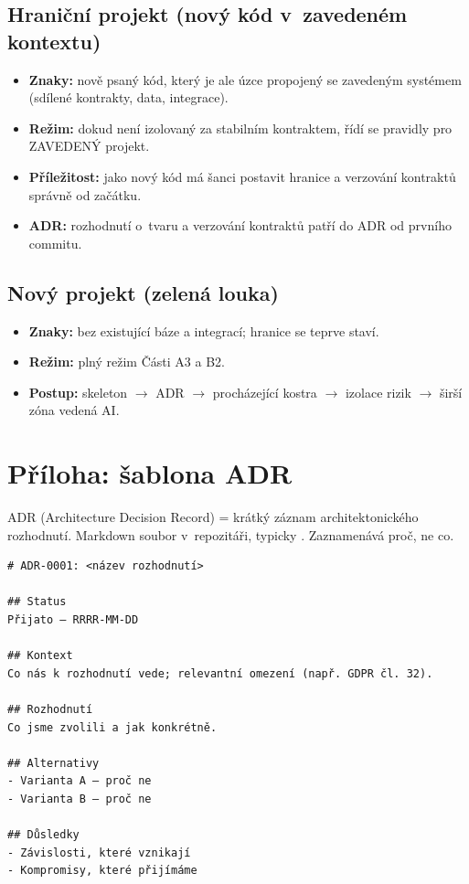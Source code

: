 \subsection{Hraniční projekt (nový kód v~zavedeném kontextu)}

\begin{itemize}
\item \textbf{Znaky:} nově psaný kód, který je ale úzce propojený se zavedeným systémem (sdílené kontrakty, data, integrace).
\item \textbf{Režim:} dokud není izolovaný za stabilním kontraktem, řídí se pravidly pro ZAVEDENÝ projekt.
\item \textbf{Příležitost:} jako nový kód má šanci postavit hranice a verzování kontraktů správně od začátku.
\item \textbf{ADR:} rozhodnutí o~tvaru a verzování kontraktů patří do ADR od prvního commitu.
\end{itemize}

\subsection{Nový projekt (zelená louka)}

\begin{itemize}
\item \textbf{Znaky:} bez existující báze a integrací; hranice se teprve staví.
\item \textbf{Režim:} plný režim Části A3 a B2.
\item \textbf{Postup:} skeleton $\rightarrow$ ADR $\rightarrow$ procházející kostra $\rightarrow$ izolace rizik $\rightarrow$ širší zóna vedená AI.
\end{itemize}

\section{Příloha: šablona ADR}

ADR (Architecture Decision Record) = krátký záznam architektonického rozhodnutí.
Markdown soubor v~repozitáři, typicky .
Zaznamenává proč, ne co.

\begin{tcolorbox}[colback=black!3,colframe=black!20,boxrule=0.4pt,arc=1pt,
  left=8pt,right=8pt,top=6pt,bottom=6pt,fontupper=\ttfamily\small]
\begin{Verbatim}[breaklines=true]
# ADR-0001: <název rozhodnutí>

## Status
Přijato — RRRR-MM-DD

## Kontext
Co nás k rozhodnutí vede; relevantní omezení (např. GDPR čl. 32).

## Rozhodnutí
Co jsme zvolili a jak konkrétně.

## Alternativy
- Varianta A — proč ne
- Varianta B — proč ne

## Důsledky
- Závislosti, které vznikají
- Kompromisy, které přijímáme
\end{Verbatim}
\end{tcolorbox}

